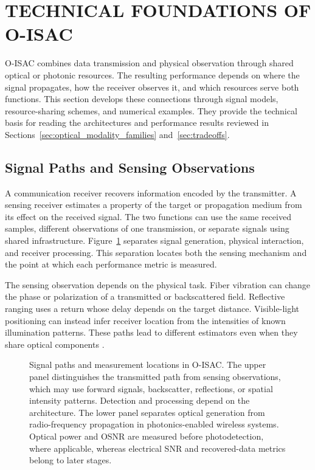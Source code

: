 \section{TECHNICAL FOUNDATIONS OF O-ISAC}
\label{sec:foundations_comparison}

O-ISAC combines data transmission and physical observation through shared
optical or photonic resources. The resulting performance depends on where
the signal propagates, how
the receiver observes it, and which resources serve both functions. This
section develops these connections through signal models, resource-sharing
schemes, and numerical examples. They provide the technical basis for reading
the architectures and performance results reviewed in
Sections~\ref{sec:optical_modality_families} and~\ref{sec:tradeoffs}.

\subsection{Signal Paths and Sensing Observations}
\label{sec:signal_paths_observations}

A communication receiver recovers information encoded by the transmitter.
A sensing receiver estimates a property of the target or propagation medium
from its effect on the received signal. The two functions can use the same
received samples, different observations of one transmission, or separate
signals using shared infrastructure.
Figure~\ref{fig:joint_evidence_anatomy} separates signal generation,
physical interaction, and receiver processing. This separation locates both
the sensing mechanism and the point at which each performance metric is
measured.

The sensing observation depends on the physical task. Fiber vibration can
change the phase or polarization of a transmitted or backscattered field.
Reflective ranging uses a return whose delay depends on the target distance.
Visible-light positioning can instead infer receiver location from the
intensities of known illumination patterns. These paths lead to different
estimators even when they share optical components
\cite{OISAC_SCR00220,OISAC_SCR00057,OISAC_SCR00912,OISAC_SCR00196}.

\begin{figure}[!t]
\centering

\caption{Signal paths and measurement locations in O-ISAC. The upper panel
distinguishes the transmitted path from sensing observations, which may use
forward signals, backscatter, reflections, or spatial intensity patterns.
Detection and processing depend on the architecture. The lower panel separates
optical generation from radio-frequency propagation in photonics-enabled
wireless systems. Optical power and OSNR are measured before photodetection,
where applicable, whereas electrical SNR and recovered-data metrics belong
to later stages.}
\label{fig:joint_evidence_anatomy}
\end{figure}

